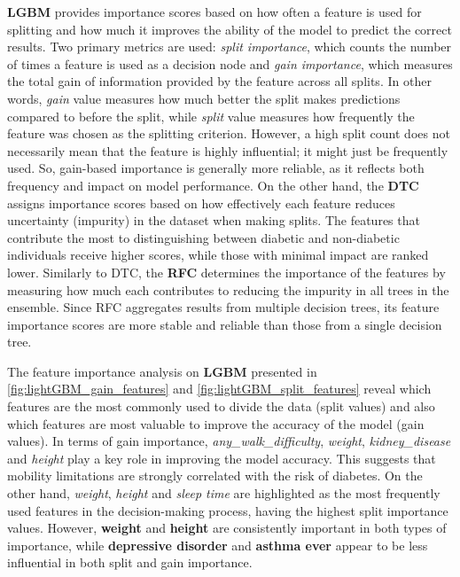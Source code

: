 \documentclass[runningheads]{llncs}
\begin{document}
\textbf{LGBM} provides importance scores based on how often a feature is used for splitting and how much it improves the ability of the model to predict the correct results. Two primary metrics \cite{lightGBM} are used: \textit{split importance}, which counts the number of times a feature is used as a decision node and \textit{gain importance}, which measures the total gain of information provided by the feature across all splits. In other words, \textit{gain} value measures how much better the split makes predictions compared to before the split, while \textit{split} value measures how frequently the feature was chosen as the splitting criterion. However, a high split count does not necessarily mean that the feature is highly influential; it might just be frequently used. So, gain-based importance is generally more reliable, as it reflects both frequency and impact on model performance. 
On the other hand, the \textbf{DTC} assigns importance scores based on how effectively each feature reduces uncertainty (impurity) in the dataset when making splits. The features that contribute the most to distinguishing between diabetic and non-diabetic individuals receive higher scores, while those with minimal impact are ranked lower. 
Similarly to DTC, the \textbf{RFC} determines the importance of the features by measuring how much each contributes to reducing the impurity in all trees in the ensemble. Since RFC aggregates results from multiple decision trees, its feature importance scores are more stable and reliable than those from a single decision tree.

The feature importance analysis on \textbf{LGBM} presented in \autoref{fig:lightGBM_gain_features} and \autoref{fig:lightGBM_split_features} reveal which features are the most commonly used to divide the data (split values) and also  which features are most valuable to improve the accuracy of the model (gain values).
In terms of gain importance, \textit{any\_walk\_difficulty}, \textit{weight}, \textit{kidney\_disease} and \textit{height} play a key role in improving the model accuracy. This suggests that mobility limitations are strongly correlated with the risk of diabetes. On the other hand, \textit{weight}, \textit{height} and \textit{sleep time} are highlighted as the most frequently used features in the decision-making process, having the highest split importance values. However, \textbf{weight} and \textbf{height} are consistently important in both types of importance, while \textbf{depressive disorder} and \textbf{asthma ever} appear to be less influential in both split and gain importance.
\end{document}
